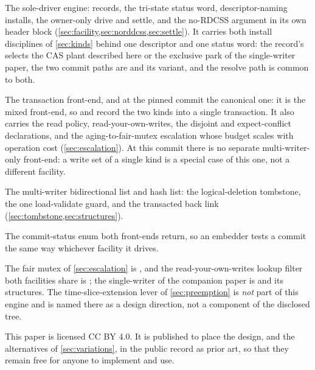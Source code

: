 \documentclass[11pt]{article}
\begin{document}
\begin{description}\setlength{\itemsep}{2pt}
\item[\code{rcu-txn-mcas.h}] The sole-driver \mcas engine: records, the tri-state
      status word, descriptor-naming installs, the owner-only drive and settle,
      and the no-RDCSS argument in its own header block
      (\cref{sec:facility,sec:norddcss,sec:settle}). It carries both install
      disciplines of \cref{sec:kinds} behind one descriptor and one status word:
      the record's  selects the CAS plant described here or the
      exclusive park of the single-writer paper, the two commit paths are
       and its  variant,
      and the resolve path is common to both.
\item[\code{rcu-txn.h}] The transaction front-end, and at the pinned commit the
      canonical one: it is the mixed front-end, so 
      and  record the two kinds into a single
      transaction. It also carries the read policy, read-your-own-writes,
      the disjoint and expect-conflict declarations, and the aging-to-fair-mutex
      escalation whose budget scales with operation cost
      (\cref{sec:escalation}). At this commit there is no separate
      multi-writer-only front-end: a write set of a single kind is a special case
      of this one, not a different facility.
\item[\code{rcu-txn-list.h}, \code{rcu-txn-hlist.h}] The multi-writer
      bidirectional list and hash list: the logical-deletion tombstone, the one
      load-validate guard, and the transacted back link
      (\cref{sec:tombstone,sec:structures}).
\item[\code{rcu-txn-status.h}] The commit-status enum both front-ends return, so
      an embedder tests a commit the same way whichever facility it drives.
\end{description}

\noindent The fair mutex of \cref{sec:escalation} is , and the
read-your-own-writes lookup filter both facilities share is ;
the single-writer \fliplatch of the companion paper is  and its
structures. The  time-slice-extension lever of \cref{sec:preemption} is
\emph{not} part of this engine and is named there as a design direction, not a
component of the disclosed tree.

This paper is licensed CC BY 4.0. It is published to place the design, and the
alternatives of \cref{sec:variations}, in the public record as prior art, so that
they remain free for anyone to implement and use.



\end{document}
